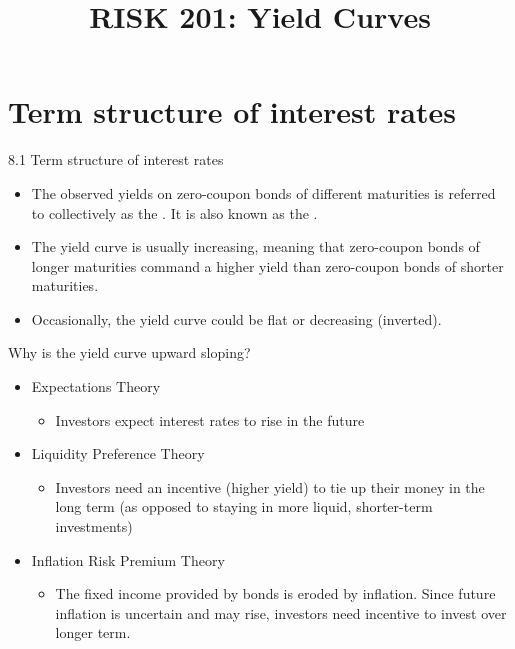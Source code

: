 \documentclass{beamer}
\title{RISK 201: Yield Curves}
\begin{document}
\maketitle

\section{Term structure of interest rates}

\begin{frame}{8.1 Term structure of interest rates}

\begin{itemize}
\item The observed yields on zero-coupon bonds of different maturities is referred to collectively as the . It is also known as the .
\bigskip
\item The yield curve is usually increasing, meaning that zero-coupon bonds of longer maturities command a higher yield than zero-coupon bonds of shorter maturities.
\bigskip
\item Occasionally, the yield curve could be flat or decreasing (inverted).
\end{itemize}

\end{frame}

\begin{frame}{Why is the yield curve upward sloping?}

\begin{itemize}
\item Expectations Theory
\begin{itemize}
\item[] Investors expect interest rates to rise in the future
\end{itemize}
\medskip
\item Liquidity Preference Theory
\begin{itemize}
\item[] Investors need an incentive (higher yield) to tie up their money in the long term (as opposed to staying in more liquid, shorter-term investments)
\end{itemize}
\medskip
\item Inflation Risk Premium Theory
\begin{itemize}
\item[] The fixed income provided by bonds is eroded by inflation. Since future inflation is uncertain and may rise, investors need incentive to invest over longer term.
\end{itemize}
\end{itemize}

\end{frame}
\end{document}
